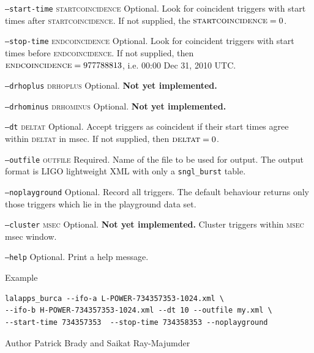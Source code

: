 \begin{entry}
\begin{entry}
\item[\texttt{--start-time} \textsc{startcoincidence}] Optional.  Look for
coincident triggers with start times after \textsc{startcoincidence}.
If not supplied,  the $\textsc{startcoincidence} = 0$.

\item[\texttt{--stop-time} \textsc{endcoincidence}]  Optional. Look for
coincident triggers with start times before \textsc{endcoincidence}.
If not supplied,  then $\textsc{endcoincidence} = 977788813$, i.e.
00:00 Dec 31, 2010 UTC.

\item[\texttt{--drhoplus} \textsc{drhoplus}] Optional.  \textbf{Not yet
implemented.}

\item[\texttt{--drhominus} \textsc{drhominus}] Optional. \textbf{Not yet
implemented.}

\item[\texttt{--dt} \textsc{deltat}] Optional. Accept triggers as coincident if
their start times agree within \textsc{deltat} in msec.  If not supplied,  then 
$\textsc{deltat} = 0$.

\item[\texttt{--outfile} \textsc{outfile}] Required.  Name of the file
to be used for output.  The output format is LIGO lightweight XML with
only a \texttt{sngl\_burst} table.

\item[\texttt{--noplayground}] Optional.  Record all triggers.  The
default behaviour returns only those triggers which lie in the
playground data set.  

\item[\texttt{--cluster} \textsc{msec}] Optional.  \textbf{Not yet
implemented.}  Cluster triggers within \textsc{msec} msec window.

\item[\texttt{--help}] Optional.  Print a help message.
\end{entry}

\item[Example]
\begin{verbatim}
lalapps_burca --ifo-a L-POWER-734357353-1024.xml \
--ifo-b H-POWER-734357353-1024.xml --dt 10 --outfile my.xml \
--start-time 734357353  --stop-time 734358353 --noplayground
\end{verbatim}
\item[Author] 
Patrick Brady and Saikat Ray-Majumder
\end{entry}
\clearpage

